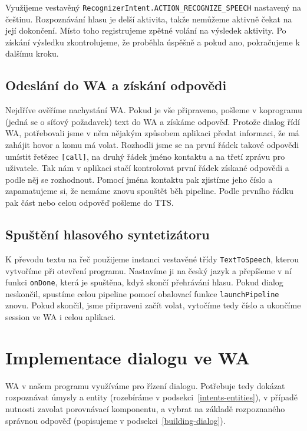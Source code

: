 Využijeme vestavěný \texttt{RecognizerIntent.ACTION\_RECOGNIZE\_SPEECH}
nastavený na češtinu. Rozpoznávání hlasu je delší aktivita, takže nemůžeme
aktivně čekat na její
dokončení. Místo toho registrujeme zpětné volání na výsledek aktivity.
Po získání výsledku zkontrolujeme, že proběhla úspěšně a pokud ano, pokračujeme
k dalšímu kroku.

\subsection{Odeslání do WA a získání odpovědi}
Nejdříve ověříme nachystání WA. Pokud je vše připraveno,
pošleme v koprogramu (jedná se o síťový požadavek) text do WA a získáme odpověď.
Protože dialog řídí WA, potřebovali jsme v něm nějakým způsobem aplikaci
předat informaci, že má zahájit hovor a komu má volat. Rozhodli jsme se na první
řádek takové odpovědi umístit řetězec \texttt{[call]}, na druhý řádek jméno kontaktu
a na třetí zprávu pro uživatele. Tak nám v aplikaci stačí kontrolovat první řádek získané
odpovědi a podle něj se rozhodnout. Pomocí jména kontaktu pak zjistíme jeho číslo
a zapamatujeme si, že nemáme znovu spouštět běh pipeline. Podle prvního řádku
pak část nebo celou odpověď pošleme do TTS.

\subsection{Spuštění hlasového syntetizátoru}

K převodu textu na řeč použijeme instanci vestavěné
třídy \texttt{TextToSpeech}, kterou vytvoříme při otevření programu. Nastavíme
ji na český jazyk a přepíšeme v ní funkci \texttt{onDone}, která je spuštěna,
když skončí přehrávání hlasu. Pokud dialog neskončil, spustíme celou pipeline
pomocí obalovací funkce \texttt{launchPipeline} znovu. Pokud
skončil, jsme připraveni začít volat, vytočíme tedy číslo a ukončíme session ve
WA i celou aplikaci.

\section{Implementace dialogu ve WA}\label{wainit}

WA v našem programu využíváme pro řízení dialogu. Potřebuje tedy dokázat
rozpoznávat úmysly a entity (rozebíráme v podsekci~\ref{intents-entities}),
v případě nutnosti zavolat porovnávací komponentu, a vybrat na základě
rozpoznaného správnou odpověď (popisujeme v podsekci~\ref{building-dialog}).

